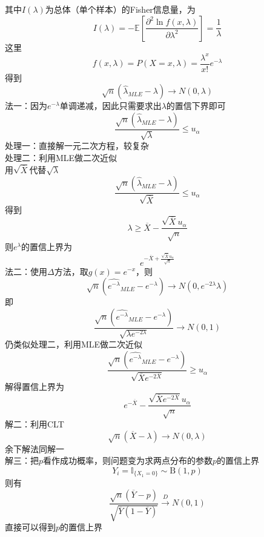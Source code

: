 \documentclass[UTF8,openany]{book}
\begin{document}
	其中$I(\lambda)$为总体（单个样本）的Fisher信息量，为
	\[
	I(\lambda)=-\mathbb{E}\left[\frac{\partial^2 \ln f(x,\lambda)}{\partial \lambda^2} \right] =\frac{1}{\lambda}
	\]
	这里
	\[
	f(x,\lambda)=P(X=x,\lambda)=\frac{\lambda^x}{x!}e^{-\lambda}
	\]
	得到
	\[
	\sqrt{n}\left(\hat{\lambda}_{MLE}-\lambda \right) \rightarrow N\left(0,\lambda \right) 
	\]
	法一：因为$e^{-\lambda}$单调递减，因此只需要求出$\lambda$的置信下界即可
	\[
	\frac{\sqrt{n}\left(\hat{\lambda}_{MLE}-\lambda \right)}{\sqrt{\lambda}}\le u_{\alpha}
	\]
	处理一：直接解一元二次方程，较复杂\\
	处理二：利用MLE做二次近似\\
	用$\sqrt{\overline{X}}$代替$\sqrt{\lambda}$
	\[
	\frac{\sqrt{n}\left(\hat{\lambda}_{MLE}-\lambda \right)}{\sqrt{\overline{X}}}\le u_{\alpha}
	\]
	得到
	\[
	\lambda \ge \overline{X}-\frac{\sqrt{\overline{X}}u_{\alpha}}{\sqrt{n}}
	\]
	则$e^{\lambda}$的置信上界为
	\[
	e^{-\overline{X}+\frac{\sqrt{\overline{X}}u_{\alpha}}{\sqrt{n}}}
	\]
	法二：使用$\Delta$方法，取$g(x)=e^{-x}$，则
	\[
	\sqrt{n}\left(\hat{e^{-\lambda}}_{MLE}-e^{-\lambda} \right) \rightarrow N\left(0,e^{-2\lambda}\lambda \right) 
	\]
	即
	\[
	\frac{\sqrt{n}\left(\hat{e^{-\lambda}}_{MLE}-e^{-\lambda} \right)}{\sqrt{\lambda e^{-2\lambda}}}\rightarrow N(0,1)
	\]
	仍类似处理二，利用MLE做二次近似
	\[
	\frac{\sqrt{n}\left(\hat{e^{-\lambda}}_{MLE}-e^{-\lambda} \right)}{\sqrt{\overline{X} e^{-2\overline{X}}}}\ge u_\alpha
	\]
	解得置信上界为
	\[
	e^{-\overline{X}}-\frac{\sqrt{\overline{X} e^{-2 \overline{X}}} u_\alpha}{\sqrt{n}}
	\]
	解二：利用CLT
	\[
	\sqrt{n}\left(\overline{X}-\lambda \right)\rightarrow N(0,\lambda) 
	\]
	余下解法同解一\\
	解三：把$p$看作成功概率，则问题变为求两点分布的参数$p$的置信上界
	\[
	Y_i=\mathbb{I}_{\{X_1=0\}}\sim \mathrm{B}(1,p)
	\]
	则有
	\[
	\frac{\sqrt{n}(\overline{Y}-p)}{\sqrt{\overline{Y}(1-\overline{Y})}} \xrightarrow{D} N(0,1)
	\]
	直接可以得到$p$的置信上界\\
	
	
	
\end{document}
